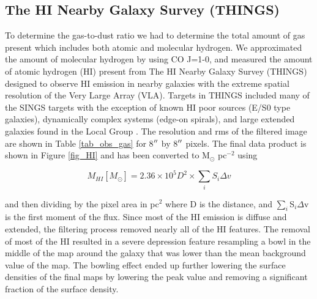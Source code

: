 
\subsection{The HI Nearby Galaxy Survey (THINGS)}

To determine the gas-to-dust ratio we had to determine the total amount of gas present which includes both atomic and molecular hydrogen.  We approximated the amount of molecular hydrogen by using CO J=1-0, and measured the amount of atomic hydrogen (HI) present from The HI Nearby Galaxy Survey (THINGS) designed to observe HI emission in nearby galaxies with the extreme spatial resolution of the Very Large Array (VLA).  Targets in THINGS included many of the SINGS targets with the exception of known HI poor sources (E/S0 type galaxies), dynamically complex systems (edge-on spirals), and large extended galaxies found in the Local Group \citep{walter2008}.  The resolution and rms of the filtered image are shown in Table \ref{tab_obs_gas} for 8$\mbox{$^{\prime\prime}$}$ by 8$\mbox{$^{\prime\prime}$}$ pixels.  The final data product is shown in Figure \ref{fig_HI} and has been converted to M$_\odot$ pc$^{-2}$ using 

\begin{equation}\label{eq:things_surf_den}
  M_{HI}\left[ M_\odot \right]=2.36 \times 10^5 D^2 \times \sum_{i}S_i\Delta v
\end{equation}

\noindent \citep{walter2008} and then dividing by the pixel area in pc$^2$ where D is the distance, and $\sum_{i}$S$_i\Delta$v is the first moment of the flux.  Since most of the HI emission is diffuse and extended, the filtering process removed nearly all of the HI features.  The removal of most of the HI resulted in a severe depression feature resampling a bowl in the middle of the map around the galaxy that was lower than the mean background value of the map.  The bowling effect ended up further lowering the surface densities of the final maps by lowering the peak value and removing a significant fraction of the surface density.

